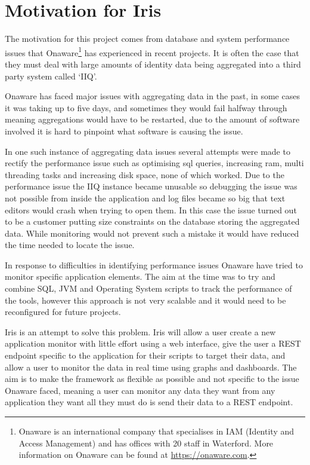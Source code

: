 \documentclass[12pt,a4paper,titlepage]{report}
\begin{document}
\section{Motivation for Iris}

The motivation for this project comes from database and system performance issues that Onaware\footnote{Onaware is an international company that specialises in IAM (Identity and Access Management) and has offices with 20 staff in Waterford. More information on Onaware can be found at \url{https://onaware.com}.} has experienced in recent projects. It is often the case that they must deal with large amounts of identity data being aggregated into a third party system called `IIQ'. 

Onaware has faced major issues with aggregating data in the past, in some cases it was taking up to five days, and sometimes they would fail halfway through meaning aggregations would have to be restarted, due to the amount of software involved it is hard to pinpoint what software is causing the issue.

In one such instance of aggregating data issues several attempts were made to rectify the performance issue such as optimising sql queries, increasing ram, multi threading tasks and increasing disk space, none of which worked. Due to the performance issue the IIQ instance became unusable so debugging the issue was not possible from inside the application and log files became so big that text editors would crash when trying to open them. In this case the issue turned out to be a customer putting size constraints on the database storing the aggregated data. While monitoring would not prevent such a mistake it would have reduced the time needed to locate the issue. 

In response to difficulties in identifying performance issues Onaware have tried to monitor specific application elements. The aim at the time was to try and combine SQL, JVM and Operating System scripts to track the performance of the tools, however this approach is not very scalable and it would need to be reconfigured for future projects. 

Iris is an attempt to solve this problem. Iris will allow a user create a new application monitor with little effort using a web interface, give the user a REST endpoint specific to the application for their scripts to target their data, and allow a user to monitor the data in real time using graphs and dashboards. The aim is to make the framework as flexible as possible and not specific to the issue Onaware faced, meaning a user can monitor any data they want from any application they want all they must do is send their data to a REST endpoint.
\end{document}
